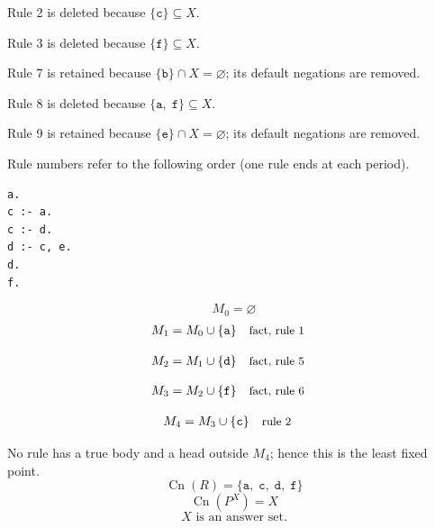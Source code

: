 \documentclass[a4paper,11pt]{article}
\newif\ifexplain
\newcommand{\explain}[1]{\ifexplain\begin{erklbox}#1\end{erklbox}\fi}
\newcommand{\why}[1]{\text{\small #1}}
\newcommand{\at}[1]{\texttt{#1}}
\begin{document}
Rule 2 is deleted because $\{\at{c}\}\subseteq X$.

Rule 3 is deleted because $\{\at{f}\}\subseteq X$.

Rule 7 is retained because $\{\at{b}\}\cap X=\varnothing$; its default negations are removed.

Rule 8 is deleted because $\{\at{a},\;\at{f}\}\subseteq X$.

Rule 9 is retained because $\{\at{e}\}\cap X=\varnothing$; its default negations are removed.

Rule numbers refer to the following order (one rule ends at each period).
\begin{small}
\begin{verbatim}
a.
c :- a.
c :- d.
d :- c, e.
d.
f.
\end{verbatim}
\end{small}
\explain{Beim Redukt bleibt die Kandidatenmenge fest. Wir entscheiden zuerst, welche Regeln wegfallen. Erst danach berechnen wir aus den verbleibenden positiven Regeln die kleinste abgeschlossene Menge. Ein Modell allein reicht nicht: Diese Menge muss genau der Kandidat sein.}
\[
M_0=\varnothing
\]
\begin{align*}
M_{1} &= M_{0}\cup \{\at{a}\} && \why{fact, rule 1}
\end{align*}
\explain{Diese Regel hat keinen Körper. Ihr Kopf $\at{a}$ ist damit ein Fakt und muss in die Menge.}
\begin{align*}
M_{2} &= M_{1}\cup \{\at{d}\} && \why{fact, rule 5}
\end{align*}
\explain{Diese Regel hat keinen Körper. Ihr Kopf $\at{d}$ ist damit ein Fakt und muss in die Menge.}
\begin{align*}
M_{3} &= M_{2}\cup \{\at{f}\} && \why{fact, rule 6}
\end{align*}
\explain{Diese Regel hat keinen Körper. Ihr Kopf $\at{f}$ ist damit ein Fakt und muss in die Menge.}
\begin{align*}
M_{4} &= M_{3}\cup \{\at{c}\} && \why{rule 2}
\end{align*}
\explain{Für $\at{c}$ brauchen wir $\at{a}$. Weil diese Voraussetzungen bereits hergeleitet sind, dürfen wir den Regelkopf jetzt aufnehmen und alle bisherigen Atome behalten; bei einer fehlenden Voraussetzung würde diese Regel dagegen noch nichts beitragen.}
No rule has a true body and a head outside $M_{4}$; hence this is the least fixed point.
\[
\operatorname{Cn}(R)=\{\at{a},\;\at{c},\;\at{d},\;\at{f}\}
\]
\[
\operatorname{Cn}(P^X)=X
\]
\[
\boxed{X\text{ is an answer set.}}
\]
\end{document}
